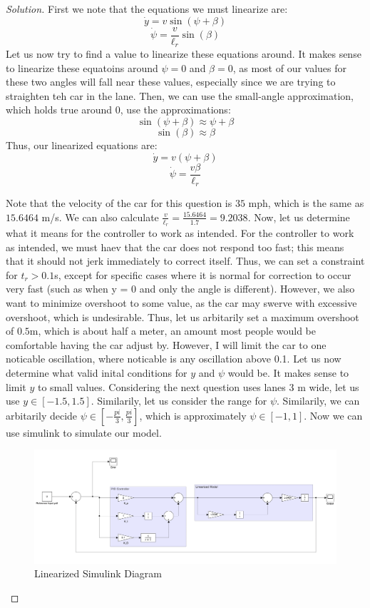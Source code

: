 \documentclass{article}
\begin{document}
\begin{proof}[Solution]

First we note that the equations we must linearize are:
\[\dot{y} = v\sin(\psi+\beta)
\]
\[\dot{\psi} = \frac{v}{\ell_r}\sin(\beta)
\]
Let us now try to find a value to linearize these equations around. It makes sense to linearize these equatoins around $\psi = 0$ and $\beta = 0$, as most of our values for these two angles will fall near these values, especially since we are trying to straighten teh car in the lane.
\newline
Then, we can use the small-angle approximation, which holds true around $0$, use the approximations:
\[\sin(\psi+\beta) \approx \psi+\beta 
\]
\[\sin(\beta) \approx \beta
\]
Thus, our linearized equations are:
\[\dot{y} = v(\psi + \beta)
    \]
\[\dot{\psi} = \frac{v\beta}{\ell_r}\]

Note that the velocity of the car for this question is $35$ mph, which is the same as $15.6464$ m/s. We can also calculate $\frac{v}{\ell_r}=\frac{15.6464}{1.7}=9.2038$. \newline
Now, let us determine what it means for the controller to work as intended. For the controller to work as intended, we must haev that the car does not respond too fast; this means that it should not jerk immediately to correct itself. Thus, we can set a constraint for $t_r > 0.1$s, except for specific cases where it is normal for correction to occur very fast (such as when y = 0 and only the angle is different). However, we also want to minimize overshoot to some value, as the car may swerve with excessive overshoot, which is undesirable. Thus, let us arbitarily set a maximum overshoot of $0.5$m, which is about half a meter, an amount most people would be comfortable having the car adjust by. However, I will limit the car to one noticable oscillation, where noticable is any oscillation above 0.1. \newline
Let us now determine what valid inital conditions for $y$ and $\psi$ would be. It makes sense to limit $y$ to small values. Considering the next question uses lanes $3$ m wide, let us use $y \in [-1.5,1.5]$. Similarily, let us consider the range for $\psi$. Similarily, we can arbitarily decide $\psi \in \left[-\frac{pi}{3},\frac{pi}{3}\right]$, which is approximately $\psi \in [-1,1]$. Now we can use simulink to simulate our model. \newline

\begin{figure}[h!]
    \includegraphics[width=\linewidth]{ECE141Q2Model.png}
    \caption{Linearized Simulink Diagram}
\end{figure}


\end{proof}
\end{document}
